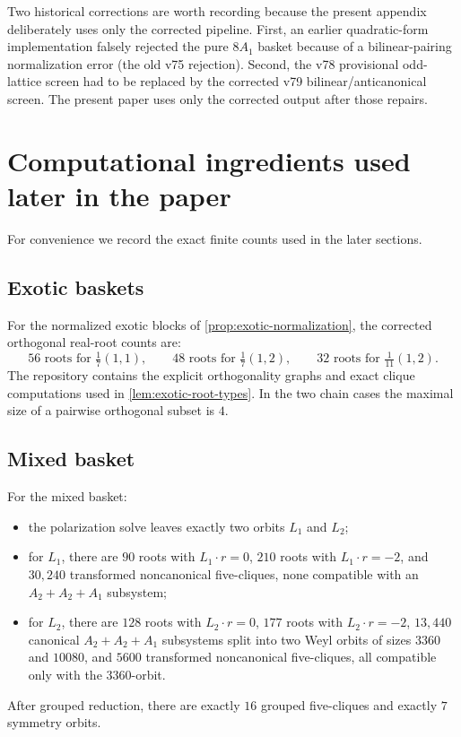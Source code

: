 \documentclass[11pt]{article}
\theoremstyle{definition}
\begin{document}
Two historical corrections are worth recording because the present appendix deliberately uses only the corrected pipeline. First, an earlier quadratic-form implementation falsely rejected the pure $8A_1$ basket because of a bilinear-pairing normalization error (the old v75 rejection). Second, the v78 provisional odd-lattice screen had to be replaced by the corrected v79 bilinear/anticanonical screen. The present paper uses only the corrected output after those repairs.

\section{Computational ingredients used later in the paper}\label{app:later-computations}
For convenience we record the exact finite counts used in the later sections.

\subsection*{Exotic baskets}
For the normalized exotic blocks of \cref{prop:exotic-normalization}, the corrected orthogonal real-root counts are:
\[
56 \text{ roots for } \tfrac17(1,1),
\qquad
48 \text{ roots for } \tfrac17(1,2),
\qquad
32 \text{ roots for } \tfrac1{11}(1,2).
\]
The repository contains the explicit orthogonality graphs and exact clique computations used in \cref{lem:exotic-root-types}. In the two chain cases the maximal size of a pairwise orthogonal subset is $4$.

\subsection*{Mixed basket}
For the mixed basket:
\begin{itemize}
\item the polarization solve leaves exactly two orbits $L_1$ and $L_2$;
\item for $L_1$, there are $90$ roots with $L_1\cdot r=0$, $210$ roots with $L_1\cdot r=-2$, and $30{,}240$ transformed noncanonical five-cliques, none compatible with an $A_2+A_2+A_1$ subsystem;
\item for $L_2$, there are $128$ roots with $L_2\cdot r=0$, $177$ roots with $L_2\cdot r=-2$, $13{,}440$ canonical $A_2+A_2+A_1$ subsystems split into two Weyl orbits of sizes $3360$ and $10080$, and $5600$ transformed noncanonical five-cliques, all compatible only with the $3360$-orbit.
\end{itemize}
After grouped reduction, there are exactly $16$ grouped five-cliques and exactly $7$ symmetry orbits.
\end{document}

